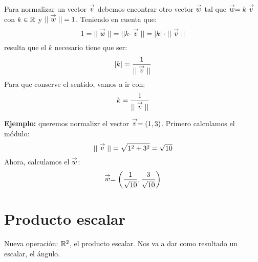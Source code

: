 Para normalizar un vector $\stackrel{\to}{v}$ debemos encontrar otro vector $\stackrel{\to}{w}$ tal que $\stackrel{\to}{w} = k \stackrel{\to}{v}$ con $k \in {\mathbb{R}}$ y $||\stackrel{\to}{w}|| = 1$. Teniendo en cuenta que:
$$1 = ||\stackrel{\to}{w}|| = || k \cdot \stackrel{\to}{v} || = |k| \cdot || \stackrel{\to}{v} ||$$
resulta que el $k$ necesario tiene que ser:
$$|k| = \frac{1}{||\stackrel{\to}{v}||}$$
Para que conserve el sentido, vamos a ir con:
$$k = \frac{1}{||\stackrel{\to}{v}||}$$

\textbf{Ejemplo:} queremos normalizr el vector $\stackrel{\to}{v} = (1,3)$. Primero calculamos el módulo:
$$||\stackrel{\to}{v}|| = \sqrt{1^2 + 3^2} = \sqrt{10}$$
Ahora, calculamos el $\stackrel{\to}{w}$:
$$\stackrel{\to}{w} = \left(\frac{1}{\sqrt{10}}, \frac{3}{\sqrt{10}}\right)$$


\section{Producto escalar}
Nueva operación: \textbf{${\mathbb{R}}^2$}, el producto escalar. Nos va a dar como resultado un escalar, el ángulo.


